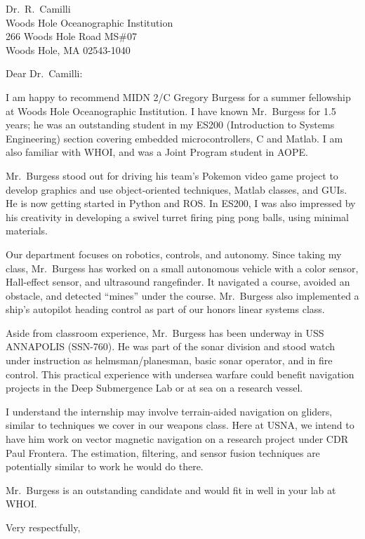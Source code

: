 \documentclass[12pt]{wrceletter}
\date{\today}
\begin{document}
\begin{letter}{%
Dr.~R.~Camilli\\
Woods Hole Oceanographic Institution\\
266 Woods Hole Road MS\#07\\
Woods Hole, MA 02543-1040}

\opening{Dear Dr.~Camilli:}
\raggedright %
\setlength{\parindent}{15pt} %

I am happy to recommend MIDN 2/C Gregory Burgess for a summer fellowship at Woods Hole Oceanographic Institution. I have known Mr.~Burgess for 1.5 years; he was an outstanding student in my ES200 (Introduction to Systems Engineering) section covering embedded microcontrollers, C and Matlab. I am also familiar with WHOI, and was a Joint Program student in AOPE. 

Mr.~Burgess stood out for driving his team's Pokemon video game project to develop graphics and use object-oriented techniques, Matlab classes, and GUIs. He is now getting started in Python and ROS. In ES200, I was also impressed by his creativity in developing a swivel turret firing ping pong balls, using minimal materials. 

Our department focuses on robotics, controls, and autonomy. Since taking my class, Mr.~Burgess has worked on a small autonomous vehicle with a color sensor, Hall-effect sensor, and ultrasound rangefinder. It navigated a course, avoided an obstacle, and detected ``mines'' under the course. Mr.~Burgess also implemented a ship's autopilot heading control as part of our honors linear systems class. 

Aside from classroom experience, Mr.~Burgess has been underway in USS ANNAPOLIS (SSN-760). He was part of the sonar division and stood watch under instruction as helmsman/planesman, basic sonar operator, and in fire control. This practical experience with undersea warfare could benefit navigation projects in the Deep Submergence Lab or at sea on a research vessel. 

I understand the internship may involve terrain-aided navigation on gliders, similar to techniques we cover in our weapons class. Here at USNA, we intend to have him work on vector magnetic navigation on a research project under CDR Paul Frontera. The estimation, filtering, and sensor fusion techniques are potentially similar to work he would do there. 

Mr.~Burgess is an outstanding candidate and would fit in well in your lab at WHOI.
\closing{Very respectfully,} %

\end{letter}
\end{document}
